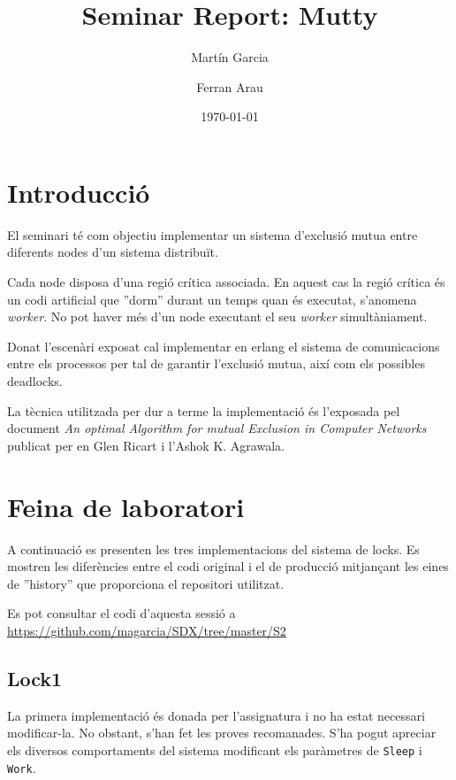 \documentclass[a4paper, 11pt]{article}
\title{Seminar Report: Mutty}
\author{Martín Garcia \and Ferran Arau}
\date{\today{}}
\begin{document}
\maketitle

\section{Introducció}


El seminari té com objectiu implementar un sistema d'exclusió mutua entre
diferents nodes d'un sistema distribuït. 

Cada node disposa d'una regió crítica associada. En aquest cas la regió crítica
és un codi artificial que ''dorm'' durant un temps quan és executat, s'anomena
\textit{worker}. No pot haver més d'un node executant el seu \textit{worker}
simultàniament. 

Donat l'escenàri exposat cal implementar en erlang el sistema de comunicacions
entre els processos per tal de garantir l'exclusió mutua, així com els possibles
deadlocks. 

La tècnica utilitzada per dur a terme la implementació és l'exposada pel
document \textit{An optimal Algorithm for mutual Exclusion in Computer Networks}
publicat per en Glen Ricart i l’Ashok K. Agrawala.

\section{Feina de laboratori}

A continuació es presenten les tres implementacions del sistema de locks. Es
mostren les diferències entre el codi original i el de producció mitjançant les
eines de ''history'' que proporciona el repositori utilitzat. 

Es pot consultar el codi d'aquesta sessió a
\url{https://github.com/magarcia/SDX/tree/master/S2}

\subsection{Lock1}

La primera implementació és donada per l'assignatura i no ha estat necessari
modificar-la. No obstant, s'han fet les proves recomanades. S'ha pogut apreciar
els diversos comportaments del sistema modificant els paràmetres de
\texttt{Sleep} i \texttt{Work}.
\end{document}

